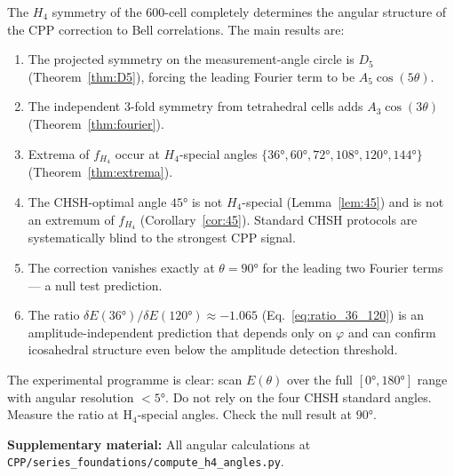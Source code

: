 \documentclass[11pt,a4paper]{article}
\newcommand{\phig}{\varphi}
\begin{document}
The $H_4$ symmetry of the 600-cell completely determines the angular
structure of the CPP correction to Bell correlations.  The main
results are:

\begin{enumerate}
\item The projected symmetry on the measurement-angle circle is $D_5$
  (Theorem~\ref{thm:D5}), forcing the leading Fourier term to be
  $A_5\cos(5\theta)$.
\item The independent 3-fold symmetry from tetrahedral cells adds
  $A_3\cos(3\theta)$ (Theorem~\ref{thm:fourier}).
\item Extrema of $f_{H_4}$ occur at $H_4$-special angles $\{36°,
  60°, 72°, 108°, 120°, 144°\}$ (Theorem~\ref{thm:extrema}).
\item The CHSH-optimal angle $45°$ is not $H_4$-special
  (Lemma~\ref{lem:45}) and is not an extremum of $f_{H_4}$
  (Corollary~\ref{cor:45}).  Standard CHSH protocols are
  systematically blind to the strongest CPP signal.
\item The correction vanishes exactly at $\theta = 90°$ for the
  leading two Fourier terms --- a null test prediction.
\item The ratio $\delta E(36°)/\delta E(120°) \approx -1.065$
  (Eq.~\ref{eq:ratio_36_120}) is an amplitude-independent prediction
  that depends only on $\phig$ and can confirm icosahedral structure
  even below the amplitude detection threshold.
\end{enumerate}

The experimental programme is clear: scan $E(\theta)$ over the full
$[0°, 180°]$ range with angular resolution $< 5°$.  Do not rely on
the four CHSH standard angles.  Measure the ratio at H$_4$-special
angles.  Check the null result at $90°$.

\noindent\textbf{Supplementary material:} All angular calculations
at \texttt{CPP/series\_foundations/compute\_h4\_angles.py}.
\end{document}
